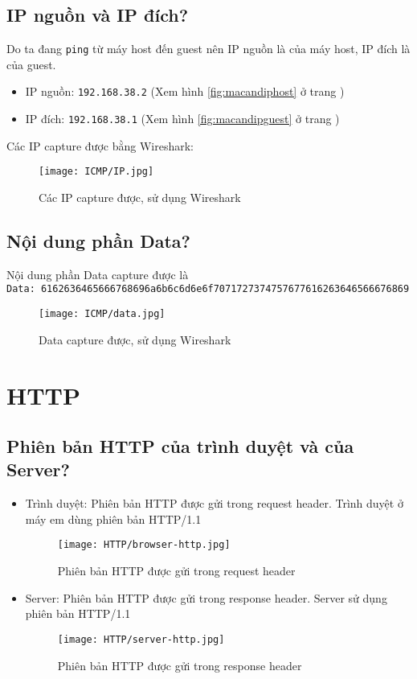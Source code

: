 \documentclass[]{article}
\begin{document}
\subsection{IP nguồn và IP đích?}
Do ta đang \texttt{ping} từ máy host đến guest nên IP nguồn là của máy host, IP đích là của guest.
\begin{itemize}
\item IP nguồn: \texttt{192.168.38.2} (Xem hình \ref{fig:macandiphost} ở trang \pageref{fig:macandiphost})
\item IP đích: \texttt{192.168.38.1} (Xem hình \ref{fig:macandipguest} ở trang \pageref{fig:macandipguest})
\end{itemize}
Các IP capture được bằng Wireshark:
\begin{figure}[H]
\centering
\texttt{[image: ICMP/IP.jpg]}
\caption{Các IP capture được, sử dụng Wireshark}
\end{figure}

\subsection{Nội dung phần Data?}
Nội dung phần Data capture được là
\\
\texttt{Data: 6162636465666768696a6b6c6d6e6f7071727374757677616263646566676869 }
\begin{figure}[H]
\centering
\texttt{[image: ICMP/data.jpg]}
\caption{Data capture được, sử dụng Wireshark}
\end{figure}

\section{HTTP}

\subsection{Phiên bản HTTP của trình duyệt và của Server?}
\begin{itemize}
\item Trình duyệt: Phiên bản HTTP được gửi trong request header. Trình duyệt ở máy em dùng phiên bản HTTP/1.1
\begin{figure}[H]
\centering
\texttt{[image: HTTP/browser-http.jpg]}
\caption{Phiên bản HTTP được gửi trong request header}
\end{figure}
\item Server: Phiên bản HTTP được gửi trong response header. Server sử dụng phiên bản HTTP/1.1
\begin{figure}[H]
\centering
\texttt{[image: HTTP/server-http.jpg]}
\caption{Phiên bản HTTP được gửi trong response header}
\end{figure}
\end{itemize}
\end{document}
